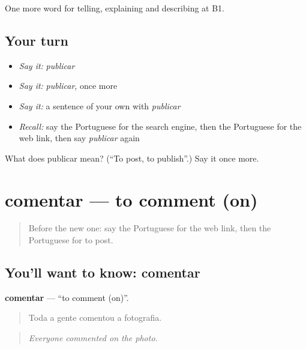 \begin{grammarlens}[title={What you've built}]
One more word for telling, explaining and describing at B1.
\end{grammarlens}

\subsection*{Your turn}
\begin{itemize}
\raggedright
  \item \emph{Say it:} \emph{publicar}
  \item \emph{Say it:} \emph{publicar}, once more
  \item \emph{Say it:} a sentence of your own with \emph{publicar}
  \item \emph{Recall:} say the Portuguese for the search engine, then the Portuguese for the web link, then say \emph{publicar} again
\end{itemize}

\begin{tcolorbox}[breakable,colback=teal!4,colframe=teal!35!black,title={Before you move on}]
What does publicar mean? (\textquotedblleft{}To post, to publish\textquotedblright{}.) Say it once more.
\end{tcolorbox}
\section[comentar]{comentar — to comment (on)}

\label{lesson:PT-C400-comentar}



\begin{quote}
Before the new one: say the Portuguese for the web link, then the Portuguese for to post.
\end{quote}

\subsection*{You'll want to know: comentar}
\textbf{comentar} — \textquotedblleft{}to comment (on)\textquotedblright{}.

\begin{quote}
Toda a gente comentou a fotografia.
\end{quote}

\begin{quote}
\emph{Everyone commented on the photo.}
\end{quote}

